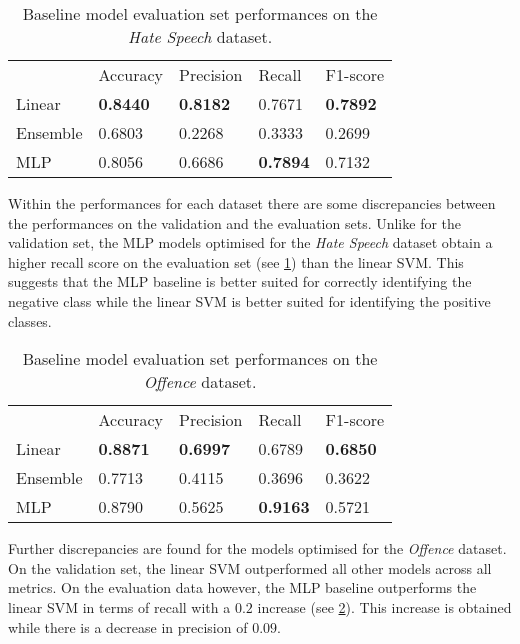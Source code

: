\begin{table}[h]
  \centering
  \begin{tabular}{lllll}
             & Accuracy        & Precision       & Recall          & F1-score        \\
    Linear   & \textbf{0.8440} & \textbf{0.8182} & 0.7671          & \textbf{0.7892} \\
    Ensemble & 0.6803          & 0.2268          & 0.3333          & 0.2699          \\
    MLP      & 0.8056          & 0.6686          & \textbf{0.7894} & 0.7132
  \end{tabular}
  \caption{Baseline model evaluation set performances on the \textit{Hate Speech} dataset.}
  \label{tab:baseline_test_wh}
\end{table}

Within the performances for each dataset there are some discrepancies between the performances on the validation and the evaluation sets.
Unlike for the validation set, the MLP models optimised for the \textit{Hate Speech} dataset obtain a higher recall score on the evaluation set (see \cref{tab:baseline_test_wh}) than the linear SVM.
This suggests that the MLP baseline is better suited for correctly identifying the negative class while the linear SVM is better suited for identifying the positive classes.

\begin{table}[h]
  \centering
  \begin{tabular}{lllll}
             & Accuracy        & Precision       & Recall          & F1-score        \\
    Linear   & \textbf{0.8871} & \textbf{0.6997} & 0.6789          & \textbf{0.6850} \\
    Ensemble & 0.7713          & 0.4115          & 0.3696          & 0.3622          \\
    MLP      & 0.8790          & 0.5625          & \textbf{0.9163} & 0.5721
  \end{tabular}
  \caption{Baseline model evaluation set performances on the \textit{Offence} dataset.}
  \label{tab:baseline_test_davidson}
\end{table}

Further discrepancies are found for the models optimised for the \textit{Offence} dataset.
On the validation set, the linear SVM outperformed all other models across all metrics.
On the evaluation data however, the MLP baseline outperforms the linear SVM in terms of recall with a $0.2$ increase (see \cref{tab:baseline_test_davidson}).
This increase is obtained while there is a decrease in precision of $0.09$.


